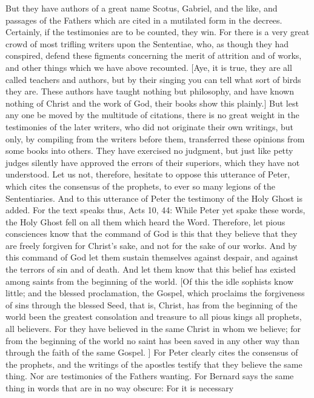 But they have authors of a great name Scotus, Gabriel, and the like,
and passages of the Fathers which are cited in a mutilated form in
the decrees.  Certainly, if the testimonies are to be counted, they
win.  For there is a very great crowd of most trifling writers upon
the Sententiae, who, as though they had conspired, defend these
figments concerning the merit of attrition and of works, and other
things which we have above recounted.  [Aye, it is true, they are all
called teachers and authors, but by their singing you can tell what
sort of birds they are.  These authors have taught nothing but
philosophy, and have known nothing of Christ and the work of God,
their books show this plainly.] But lest any one be moved by the
multitude of citations, there is no great weight in the testimonies
of the later writers, who did not originate their own writings, but
only, by compiling from the writers before them, transferred these
opinions from some books into others.  They have exercised no
judgment, but just like petty judges silently have approved the
errors of their superiors, which they have not understood.  Let us
not, therefore, hesitate to oppose this utterance of Peter, which
cites the consensus of the prophets, to ever so many legions of the
Sententiaries.  And to this utterance of Peter the testimony of the
Holy Ghost is added.  For the text speaks thus, Acts 10, 44: While
Peter yet spake these words, the Holy Ghost fell on all them which
heard the Word.  Therefore, let pious consciences know that the
command of God is this that they believe that they are freely
forgiven for Christ's sake, and not for the sake of our works.  And
by this command of God let them sustain themselves against despair,
and against the terrors of sin and of death.  And let them know that
this belief has existed among saints from the beginning of the world.
[Of this the idle sophists know little; and the blessed proclamation,
the Gospel, which proclaims the forgiveness of sins through the
blessed Seed, that is, Christ, has from the beginning of the world
been the greatest consolation and treasure to all pious kings all
prophets, all believers.  For they have believed in the same Christ
in whom we believe; for from the beginning of the world no saint has
been saved in any other way than through the faith of the same Gospel.
] For Peter clearly cites the consensus of the prophets, and the
writings of the apostles testify that they believe the same thing.
Nor are testimonies of the Fathers wanting.  For Bernard says the
same thing in words that are in no way obscure: For it is necessary
